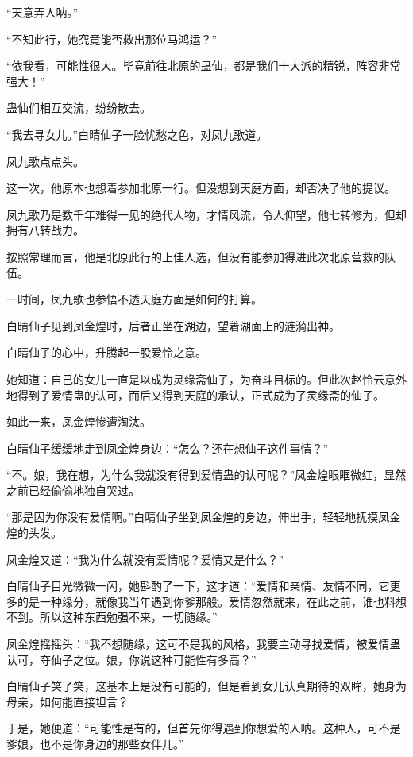 \begin{this_body}
“天意弄人呐。”

“不知此行，她究竟能否救出那位马鸿运？”

“依我看，可能性很大。毕竟前往北原的蛊仙，都是我们十大派的精锐，阵容非常强大！”

蛊仙们相互交流，纷纷散去。

“我去寻女儿。”白晴仙子一脸忧愁之色，对凤九歌道。

凤九歌点点头。

这一次，他原本也想着参加北原一行。但没想到天庭方面，却否决了他的提议。

凤九歌乃是数千年难得一见的绝代人物，才情风流，令人仰望，他七转修为，但却拥有八转战力。

按照常理而言，他是北原此行的上佳人选，但没有能参加得进此次北原营救的队伍。

一时间，凤九歌也参悟不透天庭方面是如何的打算。

白晴仙子见到凤金煌时，后者正坐在湖边，望着湖面上的涟漪出神。

白晴仙子的心中，升腾起一股爱怜之意。

她知道：自己的女儿一直是以成为灵缘斋仙子，为奋斗目标的。但此次赵怜云意外地得到了爱情蛊的认可，而后又得到天庭的承认，正式成为了灵缘斋的仙子。

如此一来，凤金煌惨遭淘汰。

白晴仙子缓缓地走到凤金煌身边：“怎么？还在想仙子这件事情？”

“不。娘，我在想，为什么我就没有得到爱情蛊的认可呢？”凤金煌眼眶微红，显然之前已经偷偷地独自哭过。

“那是因为你没有爱情啊。”白晴仙子坐到凤金煌的身边，伸出手，轻轻地抚摸凤金煌的头发。

凤金煌又道：“我为什么就没有爱情呢？爱情又是什么？”

白晴仙子目光微微一闪，她斟酌了一下，这才道：“爱情和亲情、友情不同，它更多的是一种缘分，就像我当年遇到你爹那般。爱情忽然就来，在此之前，谁也料想不到。所以这种东西勉强不来，一切随缘。”

凤金煌摇摇头：“我不想随缘，这可不是我的风格，我要主动寻找爱情，被爱情蛊认可，夺仙子之位。娘，你说这种可能性有多高？”

白晴仙子笑了笑，这基本上是没有可能的，但是看到女儿认真期待的双眸，她身为母亲，如何能直接坦言？

于是，她便道：“可能性是有的，但首先你得遇到你想爱的人呐。这种人，可不是爹娘，也不是你身边的那些女伴儿。”

\end{this_body}

